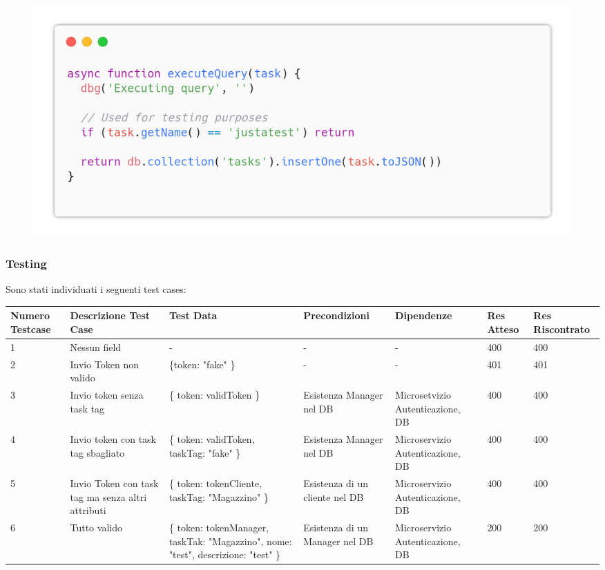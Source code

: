 \documentclass{report}
\begin{document}
\begin{figure}[H]
	\centering\includegraphics[width=1\textwidth]{images/code_crea_task4.png}
\end{figure}

\subsubsection*{Testing}
Sono stati individuati i seguenti test cases:
\begin{center} %
	\centering
	\begin{tabular}{ |p{1cm}|p{2cm}|p{2cm}|p{2cm}|p{2cm}|p{1cm}|p{1cm}| }
		\hline
		Numero Testcase & Descrizione Test Case & Test Data & Precondizioni & Dipendenze & Res Atteso & Res Riscontrato \\
		\hline
		1 & Nessun field & - & - & - & 400 & 400 \\
		\hline
		2 & Invio Token non valido & \{token: "fake" \} & - & - & 401 & 401 \\
		\hline
		3 & Invio token senza task tag & \{ token: validToken \} & Esistenza Manager nel DB & Microsetvizio Autenticazione, DB & 400 & 400 \\
		4 & Invio token con task tag sbagliato & \{ token: validToken, taskTag: "fake" \} & Esistenza Manager nel DB & Microservizio Autenticazione, DB & 400 & 400 \\
		5 & Invio Token con task tag ma senza altri attributi & \{ token: tokenCliente, taskTag: "Magazzino" \} & Esistenza di un cliente nel DB & Microservizio Autenticazione, DB & 400 & 400 \\
		\hline
		6 & Tutto valido  & \{ token: tokenManager, taskTak: "Magazzino", nome: "test", descrizione: "test" \} & Esistenza di un Manager nel DB & Microservizio Autenticazione, DB & 200 & 200 \\
		\hline
	\end{tabular}
\end{center}
\end{document}
